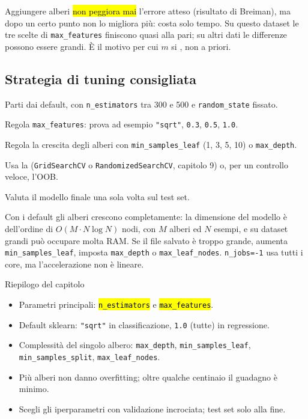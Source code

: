 \begin{intuizione}
Aggiungere alberi \hl{non peggiora mai} l'errore atteso (risultato di Breiman), ma dopo un certo punto non lo migliora più: costa solo tempo. Su questo dataset le tre scelte di \texttt{max\_features} finiscono quasi alla pari; su altri dati le differenze possono essere grandi. È il motivo per cui $m$ si , non a priori.
\end{intuizione}

\subsection{Strategia di tuning consigliata}

\begin{passi}
  \item Parti dai default, con \texttt{n\_estimators} tra 300 e 500 e \texttt{random\_state} fissato.
  \item Regola \texttt{max\_features}: prova ad esempio \texttt{"sqrt"}, \texttt{0.3}, \texttt{0.5}, \texttt{1.0}.
  \item Regola la crescita degli alberi con \texttt{min\_samples\_leaf} (1, 3, 5, 10) o \texttt{max\_depth}.
  \item Usa la  (\texttt{GridSearchCV} o \texttt{RandomizedSearchCV}, capitolo 9) o, per un controllo veloce, l'OOB.
  \item Valuta il modello finale una sola volta sul test set.
\end{passi}

\begin{consiglio}
Con i default gli alberi crescono completamente: la dimensione del modello è dell'ordine di $O(M\cdot N\log N)$ nodi, con $M$ alberi ed $N$ esempi, e su dataset grandi può occupare molta RAM. Se il file salvato è troppo grande, aumenta \texttt{min\_samples\_leaf}, imposta \texttt{max\_depth} o \texttt{max\_leaf\_nodes}. \texttt{n\_jobs=-1} usa tutti i core, ma l'accelerazione non è lineare.
\end{consiglio}

\begin{appunti}{Riepilogo del capitolo}
\begin{itemize}
  \item Parametri principali: \hl{\texttt{n\_estimators}} e \hl{\texttt{max\_features}}.
  \item Default sklearn: \texttt{"sqrt"} in classificazione, \texttt{1.0} (tutte) in regressione.
  \item Complessità del singolo albero: \texttt{max\_depth}, \texttt{min\_samples\_leaf}, \texttt{min\_samples\_split}, \texttt{max\_leaf\_nodes}.
  \item Più alberi non danno overfitting; oltre qualche centinaio il guadagno è minimo.
  \item Scegli gli iperparametri con validazione incrociata; test set solo alla fine.
\end{itemize}
\end{appunti}
